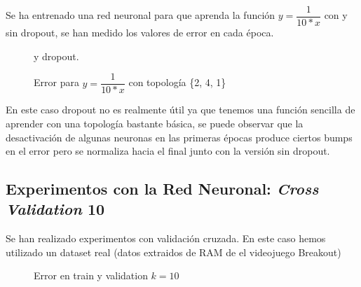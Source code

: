 Se ha entrenado una red neuronal para que aprenda la función $y=\dfrac{1}{10*x}$ con y sin dropout, se han medido los valores de error en cada época.

\begin{figure}[H]
    \centering
    
    
    \caption{Error para $y=\dfrac{1}{10*x}$ con topología \{2, 4, 1\}} y dropout. 
    \label{fig:dropoutFunctionExperiment}
\end{figure}

En este caso dropout no es realmente útil ya que tenemos una función sencilla de aprender con una topología bastante básica, se puede observar que la desactivación de algunas neuronas en las primeras épocas produce ciertos bumps en el error pero se normaliza hacia el final junto con la versión sin dropout.

\newpage
\subsection{Experimentos con la Red Neuronal: \textit{Cross Validation} 10}
\label{subsubsec:nnexperiments:CV10}

Se han realizado experimentos con validación cruzada. En este caso hemos utilizado un dataset real (datos extraidos de RAM de el videojuego Breakout)

\begin{figure}[H]
    \centering
    
    
    \caption{Error en train y validation $k = 10$} 
    \label{fig:crossValExperiment}
\end{figure}

